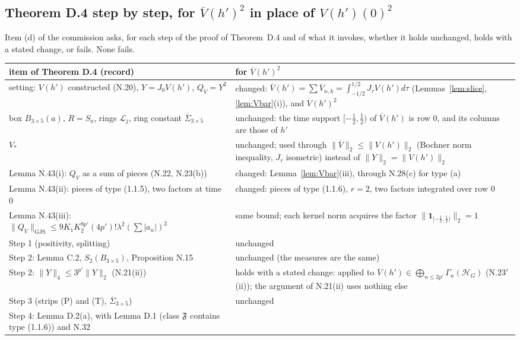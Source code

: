 \documentclass[11pt,a4paper]{article}
\newcommand{\HH}{\mathcal{H}}
\newcommand{\GJS}[1]{\lVert #1\rVert_{\mathrm{GJS}}}
\newcommand{\Vb}{\overline V}                 %
\theoremstyle{plain}
\theoremstyle{definition}
\begin{document}
\subsection{Theorem D.4 step by step, for $\Vb(h')^2$ in place of $V(h')(0)^2$}

Item (d) of the commission asks, for each step of the proof of Theorem~D.4 and of what it
invokes, whether it holds unchanged, holds with a stated change, or fails.  None fails.

\begin{center}\small
\begin{tabular}{@{}p{}p{}@{}}
\toprule
item of Theorem D.4 (record) & for $\Vb(h')^2$\\
\midrule
setting: $V(h')$ constructed (N.20), $Y=J_0V(h')$, $Q_V=Y^2$ & changed:
$\Vb(h')=\sum\Vb_{n,k}=\int_{-1/2}^{1/2}J_\tau V(h')d\tau$ (Lemmas~\ref{lem:slice},
\ref{lem:Vbar}(i)), and $\Vb(h')^2$\\
box $B_{3\times5}(a)$, $R=S_a$, rings $\mathcal L_j$, ring constant $\overline\Sigma_{3\times5}$ &
unchanged: the time support $[-\frac12,\frac12)$ of $\Vb(h')$ is row $0$, and its columns are
those of $h'$\\
$V_*$ & unchanged; used through $\|\Vb\|_2\le\|V(h')\|_2$ (Bochner norm inequality, $J_\tau$
isometric) instead of $\|Y\|_2=\|V(h')\|_2$\\
Lemma N.43(i): $Q_V$ as a sum of pieces (N.22, N.23(b)) & changed: Lemma~\ref{lem:Vbar}(iii),
through N.28(c) for type (a)\\
Lemma N.43(ii): pieces of type (1.1.5), two factors at time $0$ & changed: pieces of type
(1.1.6), $r=2$, two factors integrated over row $0$\\
Lemma N.43(iii): $\GJS{Q_V}\le9K_1K_2^{8p'}(4p')!\lambda^2(\sum|a_n|)^2$ & same bound; each kernel
norm acquires the factor $\|\mathbf 1_{[-\frac12,\frac12)}\|_2=1$\\
Step 1 (positivity, splitting) & unchanged\\
Step 2: Lemma C.2, $S_2(B_{3\times5})$, Proposition N.15 & unchanged (the measures are the same)\\
Step 2: $\|Y\|_4\le3^{p'}\|Y\|_2$ (N.21(ii)) & holds with a stated change: applied to
$\Vb(h')\in\bigoplus_{n\le2p'}\Gamma_n(\HH_G)$ (N.23$'$(ii)); the argument of N.21(ii) uses
nothing else\\
Step 3 (strips (P) and (T), $\overline\Sigma_{3\times5}$) & unchanged\\
Step 4: Lemma D.2(a), with Lemma D.1 (class $\mathfrak F$ contains type (1.1.6)) and N.32 &

\end{tabular}
\end{center}
\end{document}
